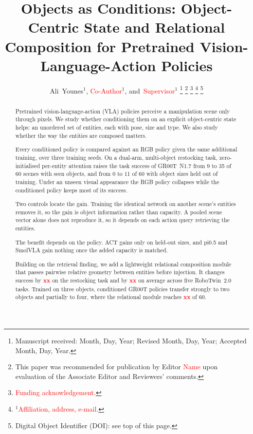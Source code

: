 \documentclass[letterpaper, 10pt, journal, twoside]{IEEEtran}
\newcommand{\tbd}[1][]{\textcolor{red}{\textbf{xx}#1}}
\begin{document}
\title{Objects as Conditions: Object-Centric State and Relational
Composition for Pretrained Vision-Language-Action Policies}

\author{Ali~Younes$^{1}$, \textcolor{red}{Co-Author}$^{1}$,
and~\textcolor{red}{Supervisor}$^{1}$%
\thanks{Manuscript received: Month, Day, Year; Revised Month, Day, Year;
Accepted Month, Day, Year.}%
\thanks{This paper was recommended for publication by Editor
\textcolor{red}{Name} upon evaluation of the Associate Editor and Reviewers'
comments.}%
\thanks{\textcolor{red}{Funding acknowledgement.}}%
\thanks{$^{1}$\textcolor{red}{Affiliation, address, e-mail.}}%
\thanks{Digital Object Identifier (DOI): see top of this page.}%
}

\maketitle

\begin{abstract}
Pretrained vision-language-action (VLA) policies perceive a manipulation
scene only through pixels. We study whether conditioning them on an explicit
object-centric state helps: an unordered set of entities, each with pose,
size and type. We also study whether the way the entities are composed
matters.

Every conditioned policy is compared against an RGB policy given the same
additional training, over three training seeds. On a dual-arm, multi-object
restocking task, zero-initialised per-entity attention raises the task
success of GR00T~N1.7 from 9 to 35 of 60 scenes with seen objects, and from
0 to 11 of 60 with object sizes held out of training. Under an unseen visual
appearance the RGB policy collapses while the conditioned policy keeps most
of its success.

Two controls locate the gain. Training the identical network on another
scene's entities removes it, so the gain is object information rather than
capacity. A pooled scene vector alone does not reproduce it, so it depends
on each action query retrieving the entities.

The benefit depends on the policy. ACT gains only on held-out sizes, and
pi0.5 and SmolVLA gain nothing once the added capacity is matched.

Building on the retrieval finding, we add a lightweight relational
composition module that passes pairwise relative geometry between entities
before injection. It changes success by \tbd{} on the restocking task and by
\tbd{} on average across five RoboTwin~2.0 tasks. Trained on three objects,
conditioned GR00T policies transfer strongly to two objects and partially to
four, where the relational module reaches \tbd{} of 60.
\end{abstract}
\end{document}
